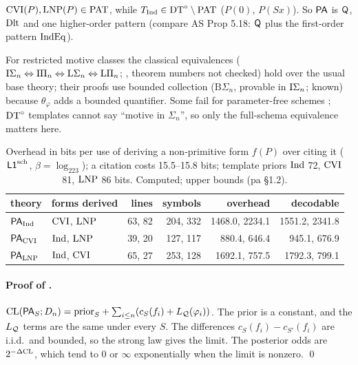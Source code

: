 \begin{remark}[Patterns]\pabrk{}\label{rem:pa:pat}
$\mathrm{CVI}(P),\mathrm{LNP}(P)\in\mathrm{PAT}$, while $T_{\mathrm{Ind}}\in\mathrm{DT}^{\circ}\setminus\mathrm{PAT}$ ($P(0)$, $P(Sx)$). So $\mathsf{PA}$ is $\mathsf{Q}$, $\mathrm{Dlt}$ and one higher-order pattern (compare AS Prop 5.18: $\mathsf{Q}$ plus the first-order pattern $\mathrm{IndEq}$).
\end{remark}

For restricted motive classes the classical equivalences ($\mathrm{I}\Sigma_{n}\Leftrightarrow\mathrm{I}\Pi_n\Leftrightarrow\mathrm{L}\Sigma_n\Leftrightarrow\mathrm{L}\Pi_n$; \citealp{kaye1991models,hajek1993metamathematics}, theorem numbers not checked) hold over the usual base theory; their proofs use bounded collection ($\mathrm{B}\Sigma_n$, provable in $\mathrm{I}\Sigma_{n}$; known) because $\theta_\varphi$ adds a bounded quantifier. Some fail for parameter-free schemes \citep{kaye1988parameter}; $\mathrm{DT}^{\circ}$ templates cannot say ``motive in $\Sigma_n$'', so only the full-schema equivalence matters here.

\begin{table}[ht]\centering\footnotesize
\begin{tabular}{@{}llrrrr@{}}
\toprule
theory & forms derived & lines & symbols & overhead & decodable\\
\midrule
$\mathsf{PA}_{\mathrm{Ind}}$ & $\mathrm{CVI}$, $\mathrm{LNP}$ & 63, 82 & 204, 332 & 1468.0, 2234.1 & 1551.2, 2341.8\\
$\mathsf{PA}_{\mathrm{CVI}}$ & $\mathrm{Ind}$, $\mathrm{LNP}$ & 39, 20 & 127, 117 & 880.4, 646.4 & 945.1, 676.9\\
$\mathsf{PA}_{\mathrm{LNP}}$ & $\mathrm{Ind}$, $\mathrm{CVI}$ & 65, 27 & 253, 128 & 1692.1, 757.5 & 1792.3, 799.1\\
\bottomrule
\end{tabular}
\caption{Overhead in bits per use of deriving a non-primitive form $f(P)$ over citing it ($\mathord{\mathsf{L1}}^{\mathrm{sch}}$, $\beta=\log_223$); a citation costs 15.5--15.8 bits; template priors $\mathrm{Ind}$ 72, $\mathrm{CVI}$ 81, $\mathrm{LNP}$ 86 bits. Computed; upper bounds (pa \S1.2).}\label{tab:pa:costs}
\end{table}

\paragraph{Proof of .} $\mathrm{CL}(\mathsf{PA}_S;D_n)=\text{prior}_S+\sum_{i\le n}(c_S(f_i)+L_{\mathcal{Q}}(\varphi_i))$. The prior is a constant, and the $L_{\mathcal{Q}}$ terms are the same under every $S$. The differences $c_S(f_i)-c_{S'}(f_i)$ are i.i.d.\ and bounded, so the strong law gives the limit. The posterior odds are $2^{-\Delta\mathrm{CL}}$, which tend to $0$ or $\infty$ exponentially when the limit is nonzero. \qed

